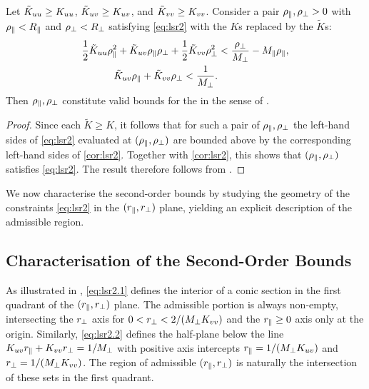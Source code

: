 \documentclass[a4paper]{cas-dc}
\begin{document}
\begin{corollary}
    \label{cor:approx}
    Let \(\tilde{K}_{uu}\ge K_{uu}\), \(\tilde{K}_{uv}\ge K_{uv}\), and \(\tilde{K}_{vv}\ge K_{vv}\). Consider a pair
    \(\rho_{\parallel},\rho_{\perp}>0\) with \(\rho_{\parallel}<R_{\parallel}\) and \(\rho_{\perp} < R_{\perp}\) satisfying \eqref{eq:lsr2} with the \(K\)s replaced by the \(\tilde{K}\)s:
    \begin{subequations}
        \begin{align}
            \frac12\tilde{K}_{uu}\rho_{\parallel}^2 + \tilde{K}_{uv}\rho_{\parallel}\rho_{\perp} + \frac12\tilde{K}_{vv}\rho_{\perp}^2 & < \frac{\rho_{\perp}}{M_{\perp}} - M_{\parallel}\rho_{\parallel}, \\
            \tilde{K}_{uv}\rho_{\parallel} + \tilde{K}_{vv}\rho_{\perp} < \frac{1}{M_{\perp}}.
        \end{align} \label{cor:lsr2}
    \end{subequations}
    Then \(\rho_{\parallel},\rho_{\perp}\) constitute valid bounds for the \LSR{} in the sense of .
\end{corollary}
\begin{proof}
    Since each \(\tilde{K} \ge K\), it follows that for such a pair of \(\rho_{\parallel},\rho_{\perp}\) the left-hand sides of \eqref{eq:lsr2} evaluated at \((\rho_{\parallel},\rho_{\perp})\) are bounded above by the corresponding left-hand sides of \eqref{cor:lsr2}. Together with \eqref{cor:lsr2}, this shows that \((\rho_{\parallel},\rho_{\perp})\) satisfies \eqref{eq:lsr2}. The result therefore follows from .
\end{proof}

We now characterise the second-order bounds by studying the geometry of the constraints \eqref{eq:lsr2} in the \((r_{\parallel},r_{\perp})\) plane, yielding an explicit description of the admissible region.


\subsection{Characterisation of the Second-Order Bounds}
\label{ssec:lsr2-geometry}

As illustrated in , \eqref{eq:lsr2.1} defines the interior of a conic section in the first quadrant of the \((r_{\parallel}, r_{\perp})\) plane. The admissible portion is always non-empty, intersecting the \(r_{\perp}\) axis for \(0 < r_{\perp} < 2/(M_{\perp} K_{vv})\) and the \(r_{\parallel} \ge 0\) axis only at the origin. Similarly, \eqref{eq:lsr2.2} defines the half-plane below the line \(K_{uv} r_{\parallel} + K_{vv} r_{\perp} = 1/M_{\perp}\) with positive axis intercepts \(r_{\parallel} = 1/(M_{\perp}K_{uv})\) and \(r_{\perp} = 1/(M_{\perp}K_{vv})\). The region of admissible \((r_{\parallel},r_{\perp})\) is naturally the intersection of these sets in the first quadrant.
\end{document}
